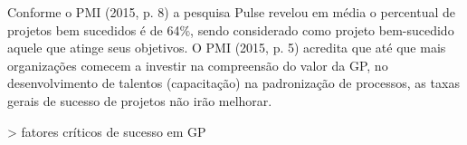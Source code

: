 Conforme o PMI (2015, p. 8) a pesquisa Pulse revelou em média o percentual de projetos bem sucedidos é de 64\%, sendo considerado como projeto bem-sucedido aquele que atinge seus objetivos. O PMI (2015, p. 5) acredita que até que mais organizações comecem a investir na compreensão do valor da GP, no desenvolvimento de talentos (capacitação) na padronização de processos, as taxas gerais de sucesso de projetos não irão melhorar.

> fatores críticos de sucesso em GP

